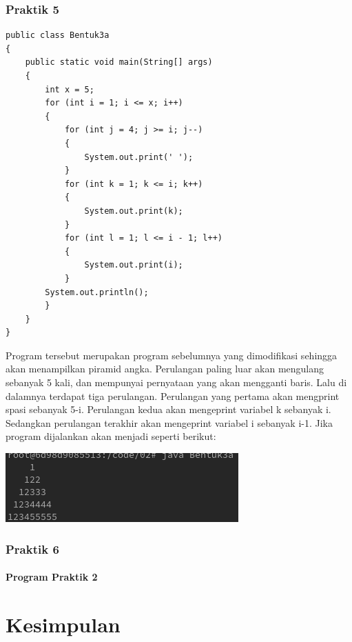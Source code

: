\documentclass[a4paper,12pt]{article}
\begin{document}
\subsubsection{Praktik 5}

\begin{lstlisting}
public class Bentuk3a
{
    public static void main(String[] args)
    {
        int x = 5;
        for (int i = 1; i <= x; i++)
        {
            for (int j = 4; j >= i; j--)
            {
                System.out.print(' ');
            }
            for (int k = 1; k <= i; k++)
            {
                System.out.print(k);
            }
            for (int l = 1; l <= i - 1; l++)
            {
                System.out.print(i);
            }
        System.out.println();
        }
    }
}
\end{lstlisting}
Program tersebut merupakan program sebelumnya yang dimodifikasi sehingga akan menampilkan piramid angka. Perulangan paling luar akan mengulang sebanyak 5 kali, dan 
mempunyai pernyataan yang akan mengganti baris. Lalu di dalamnya terdapat tiga perulangan. Perulangan yang pertama akan mengprint spasi sebanyak 5-i. Perulangan 
kedua akan mengeprint variabel k sebanyak i. Sedangkan perulangan terakhir akan mengeprint variabel i sebanyak i-1. Jika program dijalankan akan menjadi seperti berikut:\\
\begin{center}
    \includegraphics[scale=.7]{6.png}
\end{center}

\subsubsection{Praktik 6}
\paragraph{Program Praktik 2}

\newpage
\section{Kesimpulan}
\end{document}
